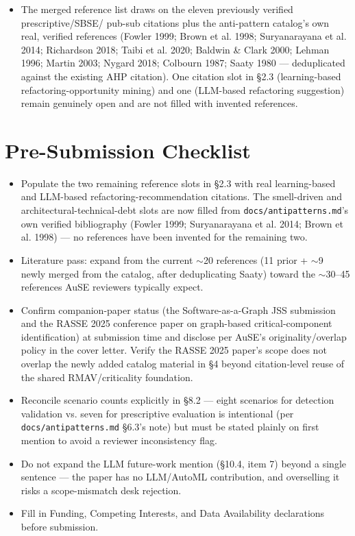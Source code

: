 \documentclass[11pt]{article}
\begin{document}
\begin{itemize}[leftmargin=*]
\item The merged reference list draws on the eleven previously verified prescriptive/SBSE/
  pub-sub citations plus the anti-pattern catalog's own real, verified references (Fowler 1999; Brown
  et al. 1998; Suryanarayana et al. 2014; Richardson 2018; Taibi et al. 2020; Baldwin \& Clark 2000;
  Lehman 1996; Martin 2003; Nygard 2018; Colbourn 1987; Saaty 1980 --- deduplicated against the
  existing AHP citation). One citation slot in \S2.3 (learning-based refactoring-opportunity mining)
  and one (LLM-based refactoring suggestion) remain genuinely open and are not filled with invented
  references.
\end{itemize}

\section*{Pre-Submission Checklist}

\begin{itemize}[leftmargin=*]
\item Populate the two remaining reference slots in \S2.3 with real learning-based and LLM-based
  refactoring-recommendation citations. The smell-driven and architectural-technical-debt slots are
  now filled from \texttt{docs/antipatterns.md}'s own verified bibliography (Fowler 1999;
  Suryanarayana et al. 2014; Brown et al. 1998) --- no references have been invented for the
  remaining two.
\item Literature pass: expand from the current $\sim$20 references (11 prior + $\sim$9 newly merged
  from the catalog, after deduplicating Saaty) toward the $\sim$30--45 references AuSE reviewers
  typically expect.
\item Confirm companion-paper status (the Software-as-a-Graph JSS submission and the RASSE 2025
  conference paper on graph-based critical-component identification) at submission time and disclose
  per AuSE's originality/overlap policy in the cover letter. Verify the RASSE 2025 paper's scope does
  not overlap the newly added catalog material in \S4 beyond citation-level reuse of the shared
  RMAV/criticality foundation.
\item Reconcile scenario counts explicitly in \S8.2 --- eight scenarios for detection validation vs.
  seven for prescriptive evaluation is intentional (per \texttt{docs/antipatterns.md} \S6.3's note)
  but must be stated plainly on first mention to avoid a reviewer inconsistency flag.
\item Do not expand the LLM future-work mention (\S10.4, item 7) beyond a single sentence --- the
  paper has no LLM/AutoML contribution, and overselling it risks a scope-mismatch desk rejection.
\item Fill in Funding, Competing Interests, and Data Availability declarations before submission.
\end{itemize}
\end{document}
